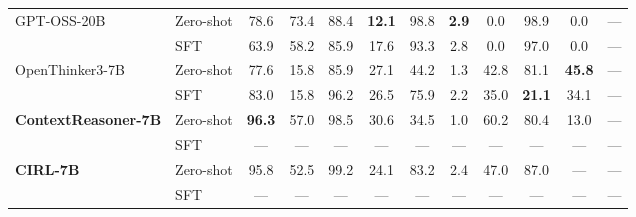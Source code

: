 \begin{table}[t]
\begin{tabular}{@{}llcccccccccc@{}}
GPT-OSS-20B & Zero-shot & 78.6 & 73.4 & 88.4 & \textbf{12.1} & 98.8 & \textbf{2.9} & 0.0 & 98.9 & 0.0 & --- \\
 & SFT & 63.9 & 58.2 & 85.9 & 17.6 & 93.3 & 2.8 & 0.0 & 97.0 & 0.0 & --- \\
\addlinespace
OpenThinker3-7B & Zero-shot & 77.6 & 15.8 & 85.9 & 27.1 & 44.2 & 1.3 & 42.8 & 81.1 & \textbf{45.8} & --- \\
 & SFT & 83.0 & 15.8 & 96.2 & 26.5 & 75.9 & 2.2 & 35.0 & \textbf{21.1} & 34.1 & --- \\
\addlinespace
\textbf{ContextReasoner-7B} & Zero-shot & \textbf{96.3} & 57.0 & 98.5 & 30.6 & 34.5 & 1.0 & 60.2 & 80.4 & 13.0 & --- \\
 & SFT & --- & --- & --- & --- & --- & --- & --- & --- & --- & --- \\
\addlinespace
\textbf{CIRL-7B} & Zero-shot & 95.8 & 52.5 & 99.2 & 24.1 & 83.2 & 2.4 & 47.0 & 87.0 & --- & --- \\
 & SFT & --- & --- & --- & --- & --- & --- & --- & --- & --- & --- \\
\bottomrule
\end{tabular}
\end{table}
